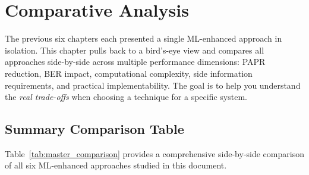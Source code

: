 \chapter{Comparative Analysis}
\label{ch:comparative}

\begin{motivation}
    The previous six chapters each presented a single ML-enhanced approach
    in isolation.  This chapter pulls back to a bird's-eye view and
    compares all approaches side-by-side across multiple performance
    dimensions: PAPR reduction, BER impact, computational complexity,
    side information requirements, and practical implementability.
    The goal is to help you understand the \emph{real trade-offs}
    when choosing a technique for a specific system.
\end{motivation}


\section{Summary Comparison Table}
\label{sec:comparison_table}

Table~\ref{tab:master_comparison} provides a comprehensive side-by-side
comparison of all six ML-enhanced approaches studied in this document.

